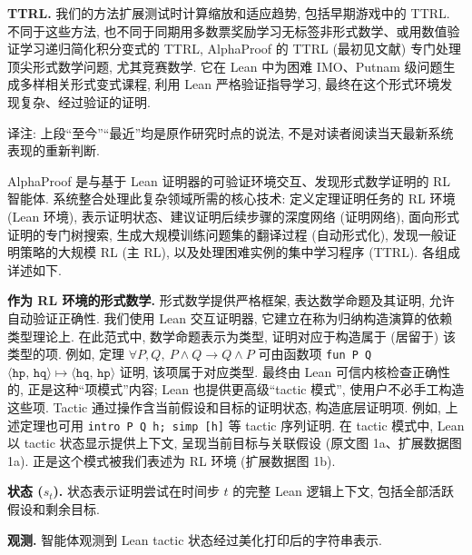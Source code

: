 \noindent\textbf{TTRL.} 我们的方法扩展测试时计算缩放\cite{alphaproof-ref9,alphaproof-ref61,alphaproof-ref62,alphaproof-ref63}和适应\cite{alphaproof-ref64,alphaproof-ref65,alphaproof-ref66}趋势, 包括早期游戏中的 TTRL\cite{alphaproof-ref67,alphaproof-ref68}. 不同于这些方法, 也不同于同期用多数票奖励学习无标签非形式数学\cite{alphaproof-ref69}、或用数值验证学习递归简化积分变式\cite{alphaproof-ref70}的 TTRL, AlphaProof 的 TTRL (最初见文献\cite{alphaproof-ref28}) 专门处理顶尖形式数学问题, 尤其竞赛数学. 它在 Lean 中为困难 IMO、Putnam 级问题生成多样相关形式变式课程, 利用 Lean 严格验证指导学习, 最终在这个形式环境发现复杂、经过验证的证明.

\begin{remark}
译注: 上段“至今”“最近”均是原作研究时点的说法, 不是对读者阅读当天最新系统表现的重新判断.
\end{remark}

\label{alphaproof-methods-system}
AlphaProof 是与基于 Lean 证明器\cite{alphaproof-ref1}的可验证环境交互、发现形式数学证明的 RL 智能体. 系统整合处理此复杂领域所需的核心技术: 定义定理证明任务的 RL 环境 (Lean 环境), 表示证明状态、建议证明后续步骤的深度网络 (证明网络), 面向形式证明的专门树搜索, 生成大规模训练问题集的翻译过程 (自动形式化), 发现一般证明策略的大规模 RL (主 RL), 以及处理困难实例的集中学习程序 (TTRL). 各组成详述如下.

\label{alphaproof-methods-lean}
\noindent\textbf{作为 RL 环境的形式数学.} 形式数学提供严格框架, 表达数学命题及其证明, 允许自动验证正确性. 我们使用 Lean 交互证明器\cite{alphaproof-ref1}, 它建立在称为归纳构造演算\cite{alphaproof-ref71}的依赖类型理论上. 在此范式中, 数学命题表示为类型, 证明对应于构造属于 (居留于) 该类型的项. 例如, 定理 $\forall P,Q,\ P\land Q\to Q\land P$ 可由函数项 \texttt{fun P Q }$\langle\texttt{hp, hq}\rangle\mapsto\langle\texttt{hq, hp}\rangle$ 证明, 该项属于对应类型. 最终由 Lean 可信内核检查正确性的, 正是这种“项模式”内容; Lean 也提供更高级“tactic 模式”, 使用户不必手工构造这些项. Tactic 通过操作含当前假设和目标的证明状态, 构造底层证明项. 例如, 上述定理也可用 \texttt{intro P Q h; simp [h]} 等 tactic 序列证明. 在 tactic 模式中, Lean 以 tactic 状态显示提供上下文, 呈现当前目标与关联假设 (原文图 1a、扩展数据图 1a). 正是这个模式被我们表述为 RL 环境 (扩展数据图 1b).

\noindent\textbf{状态 ($s_t$).} 状态表示证明尝试在时间步 $t$ 的完整 Lean 逻辑上下文, 包括全部活跃假设和剩余目标.

\noindent\textbf{观测.} 智能体观测到 Lean tactic 状态经过美化打印后的字符串表示.

